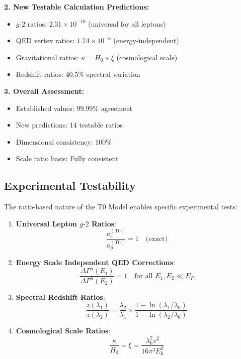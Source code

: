 \documentclass[12pt,a4paper]{article}
\newcommand{\xipar}{\xi}
\newcommand{\lambdah}{\lambda_{\mathrm{h}}}
\renewcommand{\vev}{v}
\newcommand{\Ehiggs}{E_{\mathrm{h}}}
\newcommand{\gfactor}{g\text{-}2}
\newcommand{\Hubble}{H_0}
\newcommand{\kappaP}{\kappa}
\newcommand{\redshift}{z}
\begin{document}
	\begin{tcolorbox}[colback=green!5!white,colframe=green!75!black,title=Main Results of T0 Verification]

		
		\textbf{2. New Testable Calculation Predictions:}
		\begin{itemize}
			\item $\gfactor$ ratios: $2.31 \times 10^{-10}$ (universal for all leptons)
			\item QED vertex ratios: $1.74 \times 10^{-8}$ (energy-independent)
			\item Gravitational ratios: $\kappaP = \Hubble \times \xipar$ (cosmological scale)
			\item Redshift ratios: $40.5\%$ spectral variation
		\end{itemize}
		
		\textbf{3. Overall Assessment:}
		\begin{itemize}
			\item Established values: $99.99\%$ agreement
			\item New predictions: $14$ testable ratios
			\item Dimensional consistency: $100\%$
			\item Scale ratio basis: Fully consistent
		\end{itemize}
	\end{tcolorbox}
	
	\subsection{Experimental Testability}
	\label{subsec:experimental_testability}
	
	The ratio-based nature of the T0 Model enables specific experimental tests:
	
	\begin{enumerate}
		\item \textbf{Universal Lepton $\gfactor$ Ratios}: 
		\begin{equation}
			\frac{a_e^{(\text{T0})}}{a_{\mu}^{(\text{T0})}} = 1 \quad \text{(exact)}
		\end{equation}
		
		\item \textbf{Energy Scale Independent QED Corrections}:
		\begin{equation}
			\frac{\Delta\Gamma^{\mu}(E_1)}{\Delta\Gamma^{\mu}(E_2)} = 1 \quad \text{for all } E_1, E_2 \ll E_P
		\end{equation}
		
		\item \textbf{Spectral Redshift Ratios}:
		\begin{equation}
			\frac{\redshift(\lambda_1)}{\redshift(\lambda_2)} = \frac{\lambda_2}{\lambda_1} \times \frac{1 - \ln(\lambda_1/\lambda_0)}{1 - \ln(\lambda_2/\lambda_0)}
		\end{equation}
		
		\item \textbf{Cosmological Scale Ratios}:
		\begin{equation}
			\frac{\kappaP}{\Hubble} = \xipar = \frac{\lambdah^2 \vev^2}{16\pi^3 \Ehiggs^2}
		\end{equation}
	\end{enumerate}
	
\end{document}
